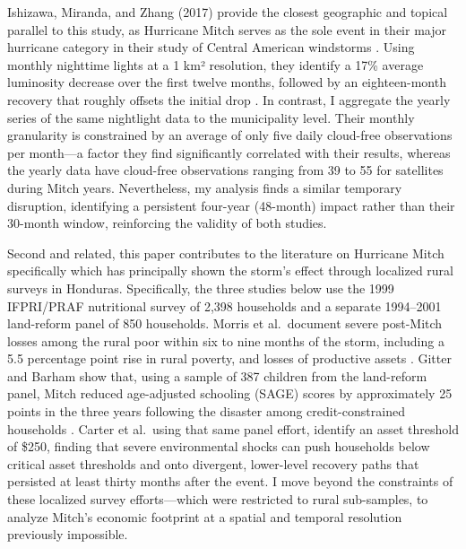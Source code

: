 \documentclass[12pt]{article}
\begin{document}
Ishizawa, Miranda, and Zhang (2017) provide the closest geographic and topical parallel to this study, as Hurricane Mitch serves as the sole event in their major hurricane category in their study of Central American windstorms \citeyear{ishizawa2017windstorms}. Using monthly nighttime lights at a 1 km² resolution, they identify a 17\% average luminosity decrease over the first twelve months, followed by an eighteen-month recovery that roughly offsets the initial drop \parencite{ishizawa2017windstorms}. In contrast, I aggregate the yearly series of the same nightlight data to the municipality level. Their monthly granularity is constrained by an average of only five daily cloud-free observations per month—a factor they find significantly correlated with their results, whereas the yearly data have cloud-free observations ranging from 39 to 55 for satellites during Mitch years. Nevertheless, my analysis finds a similar temporary disruption, identifying a persistent four-year (48-month) impact rather than their 30-month window, reinforcing the validity of both studies.

Second and related, this paper contributes to the literature on Hurricane Mitch specifically which has principally shown the storm's effect through localized rural surveys in Honduras. Specifically, the three studies below use the 1999 IFPRI/PRAF nutritional survey of 2,398 households and a separate 1994–2001 land-reform panel of 850 households.  Morris et al.\ document severe post-Mitch losses among the rural poor within six to nine months of the storm, including a 5.5 percentage point rise in rural poverty, and losses of productive assets \parencite{morris2002mitch}. Gitter and Barham show that, using a sample of 387 children from the land-reform panel, Mitch reduced age-adjusted schooling (SAGE) scores by approximately 25 points in the three years following the disaster among credit-constrained households \parencite{gitter2007credit}. Carter et al.\, using that same panel effort, identify an asset threshold of \$250, finding that severe environmental shocks can push households below critical asset thresholds and onto divergent, lower-level recovery paths that persisted at least thirty months after the event. I move beyond the constraints of these localized survey efforts—which were restricted to rural sub-samples, to analyze Mitch’s economic footprint at a spatial and temporal resolution previously impossible.
\end{document}
